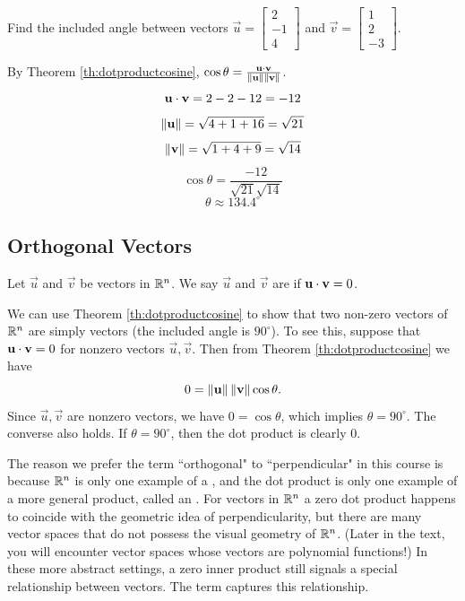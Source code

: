 \documentclass{ximera}
\begin{document}
\begin{example}\label{ex:anglebetweenvectors}
Find the included angle between vectors $\vec{u}=\begin{bmatrix}2\\-1\\4\end{bmatrix}$ and $\vec{v}=\begin{bmatrix}1\\2\\-3\end{bmatrix}$.

\begin{explanation}
By Theorem \ref{th:dotproductcosine}, $\cos \theta=\frac{\mathbf{u}\cdot \mathbf{v}}{\left\lVert\mathbf{u}\right\rVert\left\lVert\mathbf{v}\right\rVert}$.  
$$\mathbf{u}\cdot\mathbf{v}=2-2-12=-12$$
$$\left\lVert\mathbf{u}\right\rVert=\sqrt{4+1+16}=\sqrt{21}$$
$$\left\lVert\mathbf{v}\right\rVert=\sqrt{1+4+9}=\sqrt{14}$$
$$\cos\theta =\frac{-12}{\sqrt{21}\sqrt{14}}$$
$$\theta \approx 134.4^{\circ}  $$
\end{explanation}
\end{example}

\subsection*{Orthogonal Vectors}

\begin{definition}\label{def:orthovectors} 
Let $\vec{u}$ and $\vec{v}$ be vectors in $\mathbb{R}^n$. We say $\vec{u}$ and $\vec{v}$ are  if $\mathbf{u}\cdot \mathbf{v}=0$.
\end{definition}

We can use Theorem \ref{th:dotproductcosine} to show that two non-zero  vectors of $\mathbb{R}^n$ are simply  vectors (the included angle is $90^{\circ}$).  To see this, suppose that $\mathbf{u}\cdot\mathbf{v}=0$ for nonzero vectors $\vec{u},\vec{v}$.  Then from Theorem \ref{th:dotproductcosine} we have
$$0=\left\lVert\mathbf{u}\right\rVert\left\lVert\mathbf{v}\right\rVert\cos\theta.$$
Since $\vec{u},\vec{v}$ are nonzero vectors, we have $0=\cos\theta$, which implies $\theta=90^{\circ}$.  The converse also holds.  If $\theta=90^{\circ}$, then the dot product is clearly 0.

The reason we prefer the term ``orthogonal" to ``perpendicular" in this course is because $\mathbb{R}^n$ is only one example of a , and the dot product is only one example of a more general product, called an .  For vectors in $\mathbb{R}^n$ a zero dot product happens to coincide with the geometric idea of perpendicularity, but there are many vector spaces that do not possess the visual geometry of $\mathbb{R}^n$.  (Later in the text, you will encounter vector spaces whose vectors are polynomial functions!)  In these more abstract settings, a zero inner product still signals a special relationship between vectors.  The term  captures this relationship.
\end{document}
